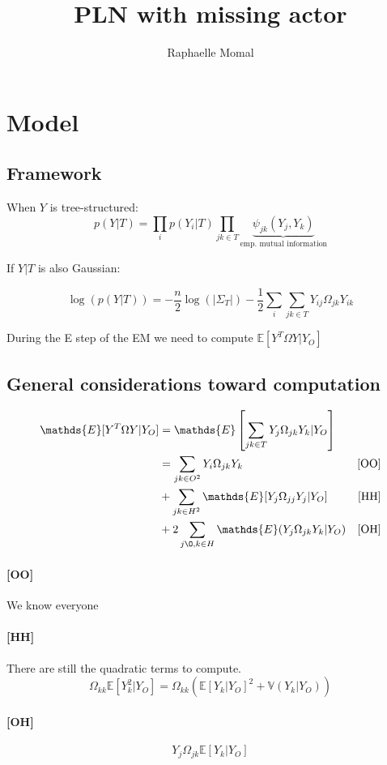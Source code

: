 \documentclass[11pt,a4paper]{article}
\author{Raphaelle Momal}
\title{PLN with missing actor}
\newcommand{\Esp}{\mathds{E}}
\begin{document}
\maketitle

\section{Model}
\subsection{Framework}
When $Y$ is tree-structured:
$$ p(Y|T) = \prod_i  p(Y_i|T) \prod_{jk\in T} \underbrace{\psi_{jk}(Y_j,Y_k)}_{\text{emp. mutual  information}}$$

If $Y|T$ is also Gaussian:

$$\log(p(Y|T)) = -\frac{n}{2}\log(|\Sigma_T|) - \frac{1}{2} \sum_i\sum_{jk\in T} Y_{ij} \Omega_{jk} Y_{ik}$$

During the E step of the EM we need to compute $\Esp[Y^T\Omega Y|Y_O]$
\subsection{General considerations toward computation}
\begin{align*}
 \Esp[Y^T\Omega Y|Y_O] &=\Esp\left[\sum_{jk\in T } Y_j\Omega_{jk}Y_k|Y_O\right]&\\
& = \sum_{jk\in O^2} Y_i\Omega_{jk} Y_k & \text{[OO]}\\
&+\sum_{jk \in H^2} \Esp[Y_j\Omega_{jj}Y_j|Y_O] & \text{[HH]} \\
&+2 \sum_{j\O, k \in H} \Esp(Y_j\Omega_{jk} Y_k |Y_O) & \text{[OH]}\\
\end{align*}

\paragraph{[OO]} We know everyone
\paragraph{[HH]} There are still the quadratic terms to compute. 
$$ \Omega_{kk} \Esp[Y_k^2|Y_O] = \Omega_{kk} \left( \Esp [Y_k|Y_O]^2 + \mathds{V}(Y_k|Y_O)\right)$$

\paragraph{[OH]}$$ Y_j\Omega_{jk}\Esp[Y_k|Y_O]$$
\end{document}
